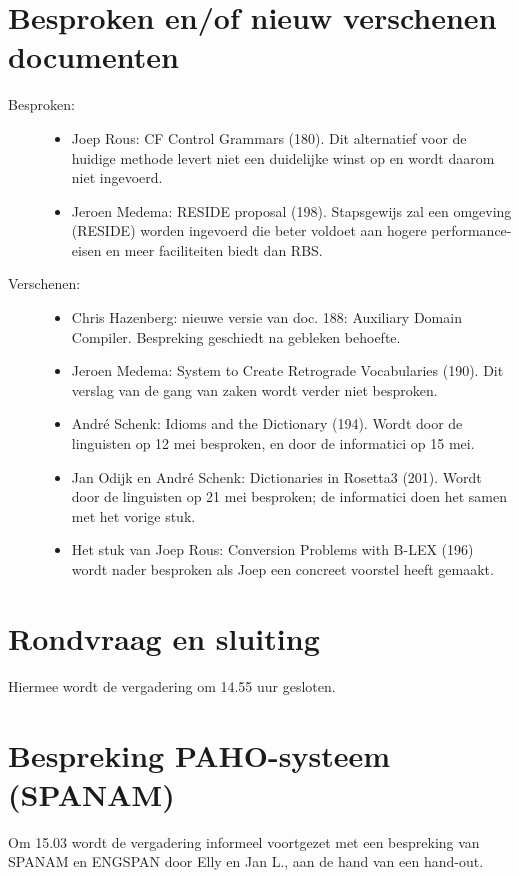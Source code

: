 \section{Besproken en/of nieuw verschenen documenten}
\begin{description}
  \item [Besproken:]\mbox{}

  \begin{itemize}
  \item Joep Rous: CF Control Grammars (180). Dit alternatief voor de huidige 
methode levert niet een duidelijke winst op en wordt daarom niet ingevoerd.
  \item Jeroen Medema: RESIDE proposal (198). Stapsgewijs zal een
omgeving (RESIDE) worden ingevoerd die beter voldoet aan hogere performance-
eisen en meer faciliteiten biedt dan RBS.
\end{itemize}
  \item [Verschenen:]\mbox{}

  \begin{itemize}
  \item Chris Hazenberg: nieuwe versie van doc. 188: Auxiliary Domain Compiler.
Bespreking geschiedt na gebleken behoefte.
  \item Jeroen Medema: System to Create Retrograde Vocabularies (190). Dit 
verslag van de gang van zaken wordt verder niet besproken.
  \item Andr\'{e} Schenk: Idioms and the Dictionary (194). Wordt door de 
linguisten op 12 mei besproken, en door de informatici op 15 mei.
  \item Jan Odijk en Andr\'{e} Schenk: Dictionaries in Rosetta3 (201). Wordt 
door de linguisten op 21 mei besproken; de informatici doen het samen met het 
vorige stuk.
  \item Het stuk van Joep Rous: Conversion Problems with B-LEX (196) wordt 
nader besproken als Joep een concreet voorstel heeft gemaakt.
  \end{itemize}
\end{description}

\section{Rondvraag en sluiting}
Hiermee wordt de vergadering om 14.55 uur gesloten.

\section*{Bespreking PAHO-systeem (SPANAM)}
Om 15.03 wordt de vergadering informeel voortgezet met een bespreking van 
SPANAM en ENGSPAN door Elly en Jan L., aan de hand van een hand-out.


